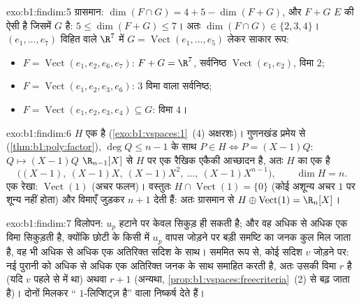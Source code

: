 \begin{solution}{exo:b1:findim:5}
ग्रासमान: $\dim(F \cap G) = 4 + 5 - \dim(F + G)$, और $F + G$ $E$ की ऐसी
 है जिसमें $G$ है: $5 \leq \dim(F+G) \leq 7$। अतः $\dim(F \cap G)
\in \{2, 3, 4\}$। $(e_1, \dots, e_7)$ विहित  वाले $\R^7$ में $G =
\operatorname{Vect}(e_1, \dots, e_5)$ लेकर साकार रूप:
\begin{itemize}
  \item $F = \operatorname{Vect}(e_1, e_2, e_6, e_7)$: $F + G = \R^7$,
  सर्वनिष्ठ $\operatorname{Vect}(e_1, e_2)$, विमा $2$;
  \item $F = \operatorname{Vect}(e_1, e_2, e_3, e_6)$: $3$ विमा वाला
  सर्वनिष्ठ;
  \item $F = \operatorname{Vect}(e_1, e_2, e_3, e_4) \subseteq G$: विमा $4$।
\end{itemize}
\end{solution}

\begin{solution}{exo:b1:findim:6}
$H$ एक  है (\cref{exo:b1:vspaces:1}~(4) अक्षरशः)। गुणनखंड प्रमेय से
(\cref{thm:b1:poly:factor}), $\deg Q \leq n - 1$ के साथ $P \in H \iff P =
(X-1)Q$:  $Q \mapsto (X-1)Q$ $\R_{n-1}[X]$ से $H$ पर एक रैखिक
एकैकी आच्छादन है, अतः $H$ का एक  है
\[
\bigl((X-1),\ (X-1)X,\ (X-1)X^2,\ \dots,\ (X-1)X^{n-1}\bigr),
\qquad \dim H = n .
\]
एक  रेखा: $\operatorname{Vect}(1)$ (अचर फलन)। वस्तुतः $H \cap
\operatorname{Vect}(1) = \{0\}$ (कोई अशून्य अचर $1$ पर शून्य नहीं होता) और
विमाएँ जुड़कर $n + 1$ देती हैं: अतः ग्रासमान से $H \oplus
\operatorname{Vect}(1) = \R_n[X]$।
\end{solution}

\begin{solution}{exo:b1:findim:7}
विलोपन: $u_p$ हटाने पर  केवल सिकुड़ ही सकती है; और वह अधिक से
अधिक एक विमा सिकुड़ती है, क्योंकि छोटी  के किसी  में $u_p$
वापस जोड़ने पर बड़ी समष्टि का जनक कुल मिल जाता है, वह भी अधिक से अधिक एक
अतिरिक्त सदिश के साथ। सममित रूप से, कोई सदिश $v$ जोड़ने पर: नई 
पुरानी को अधिक से अधिक एक अतिरिक्त जनक के साथ समाहित करती है, अतः उसकी विमा
$r$ है (यदि $v$ पहले से  में था) अथवा $r + 1$ (अन्यथा,
\cref{prop:b1:vspaces:freecriteria}~(2) से  बढ़ जाता है)। दोनों 
मिलकर `` $1$-लिप्शिट्ज़ है'' वाला निष्कर्ष देते हैं।
\end{solution}

